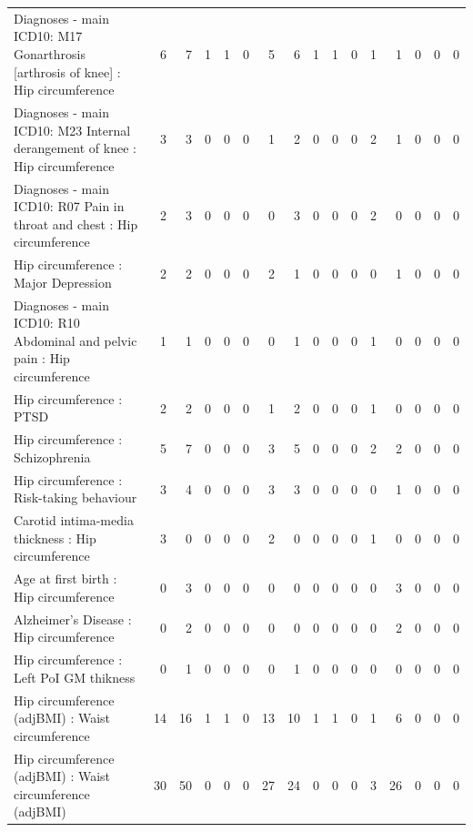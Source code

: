 \begin{table}[ht]
\begin{tabular}{lrrrrrrrrrrrrrrr}
  Diagnoses - main ICD10: M17 Gonarthrosis [arthrosis of knee] : Hip circumference  &   6 &   7 &   1 &   1 &   0 &   5 &   6 &   1 &   1 &   0 &   1 &   1 &   0 &   0 &   0 \\ 
  Diagnoses - main ICD10: M23 Internal derangement of knee : Hip circumference  &   3 &   3 &   0 &   0 &   0 &   1 &   2 &   0 &   0 &   0 &   2 &   1 &   0 &   0 &   0 \\ 
  Diagnoses - main ICD10: R07 Pain in throat and chest : Hip circumference  &   2 &   3 &   0 &   0 &   0 &   0 &   3 &   0 &   0 &   0 &   2 &   0 &   0 &   0 &   0 \\ 
  Hip circumference  : Major Depression &   2 &   2 &   0 &   0 &   0 &   2 &   1 &   0 &   0 &   0 &   0 &   1 &   0 &   0 &   0 \\ 
  Diagnoses - main ICD10: R10 Abdominal and pelvic pain : Hip circumference  &   1 &   1 &   0 &   0 &   0 &   0 &   1 &   0 &   0 &   0 &   1 &   0 &   0 &   0 &   0 \\ 
  Hip circumference  : PTSD &   2 &   2 &   0 &   0 &   0 &   1 &   2 &   0 &   0 &   0 &   1 &   0 &   0 &   0 &   0 \\ 
  Hip circumference  : Schizophrenia &   5 &   7 &   0 &   0 &   0 &   3 &   5 &   0 &   0 &   0 &   2 &   2 &   0 &   0 &   0 \\ 
  Hip circumference  : Risk-taking behaviour &   3 &   4 &   0 &   0 &   0 &   3 &   3 &   0 &   0 &   0 &   0 &   1 &   0 &   0 &   0 \\ 
  Carotid intima-media thickness : Hip circumference  &   3 &   0 &   0 &   0 &   0 &   2 &   0 &   0 &   0 &   0 &   1 &   0 &   0 &   0 &   0 \\ 
  Age at first birth  : Hip circumference  &   0 &   3 &   0 &   0 &   0 &   0 &   0 &   0 &   0 &   0 &   0 &   3 &   0 &   0 &   0 \\ 
  Alzheimer's Disease : Hip circumference  &   0 &   2 &   0 &   0 &   0 &   0 &   0 &   0 &   0 &   0 &   0 &   2 &   0 &   0 &   0 \\ 
  Hip circumference  : Left PoI GM thikness &   0 &   1 &   0 &   0 &   0 &   0 &   1 &   0 &   0 &   0 &   0 &   0 &   0 &   0 &   0 \\ 
  Hip circumference (adjBMI) : Waist circumference  &  14 &  16 &   1 &   1 &   0 &  13 &  10 &   1 &   1 &   0 &   1 &   6 &   0 &   0 &   0 \\ 
  Hip circumference (adjBMI) : Waist circumference (adjBMI) &  30 &  50 &   0 &   0 &   0 &  27 &  24 &   0 &   0 &   0 &   3 &  26 &   0 &   0 &   0 \\ 

\end{tabular}
\end{table}
